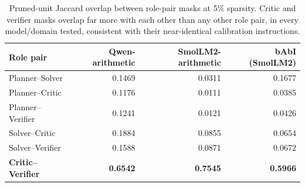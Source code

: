\begin{table}[t]
\centering
\caption{Pruned-unit Jaccard overlap between role-pair masks at 5\% sparsity. Critic and
verifier masks overlap far more with each other than any other role pair, in every
model/domain tested, consistent with their near-identical calibration instructions.}
\label{tab:mask-overlap}
\begin{tabular}{lrrr}
\toprule
Role pair & Qwen-arithmetic & SmolLM2-arithmetic & bAbI (SmolLM2) \\
\midrule
Planner--Solver   & 0.1469 & 0.0311 & 0.1677 \\
Planner--Critic   & 0.1176 & 0.0111 & 0.0385 \\
Planner--Verifier & 0.1241 & 0.0121 & 0.0426 \\
Solver--Critic    & 0.1884 & 0.0855 & 0.0654 \\
Solver--Verifier  & 0.1588 & 0.0871 & 0.0672 \\
\textbf{Critic--Verifier} & \textbf{0.6542} & \textbf{0.7545} & \textbf{0.5966} \\
\bottomrule
\end{tabular}
\end{table}
